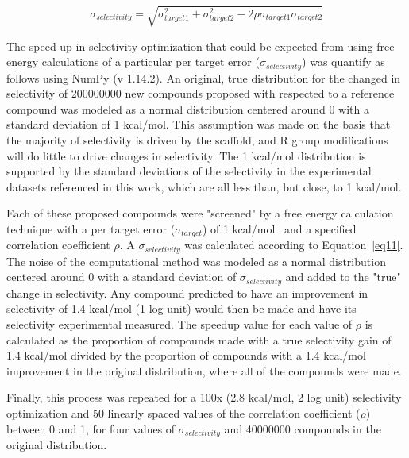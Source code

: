 \documentclass[9pt,lineno]{elife-modified} %
\begin{document}
\begin{equation}\label{eq11}
\sigma_{selectivity} = \sqrt{\sigma_{target1}^2 + \sigma_{target2}^2 - 2\rho\sigma_{target1}\sigma_{target2}}
\end{equation}

The speed up in selectivity optimization that could be expected from using free energy calculations of a particular per target error ($\sigma_{selectivity}$) was quantify as follows using NumPy (v 1.14.2). An original, true distribution for the changed in selectivity of 200000000 new compounds proposed with respected to a reference compound was modeled as a normal distribution centered around 0 with a standard deviation of 1 kcal/mol. This assumption was made on the basis that the majority of selectivity is driven by the scaffold, and R group modifications will do little to drive changes in selectivity. The 1 kcal/mol distribution is supported by the standard deviations of the selectivity in the experimental datasets referenced in this work, which are all less than, but close, to 1 kcal/mol. 

Each of these proposed compounds were "screened" by a free energy calculation technique with a per target error ($\sigma_{target}$) of 1 kcal/mol~\citep{Wang:J.Am.Chem.Soc.:2015} and a specified correlation coefficient $\rho$. A $\sigma_{selectivity}$ was calculated according to Equation~\ref{eq11}. The noise of the computational method was modeled as a normal distribution centered around 0 with a standard deviation of $\sigma_{selectivity}$ and added to the "true" change in selectivity. Any compound predicted to have an improvement in selectivity of 1.4 kcal/mol (1 log unit) would then be made and have its selectivity experimental measured. The speedup value for each value of $\rho$ is calculated as the proportion of compounds made with a true selectivity gain of 1.4 kcal/mol divided by the proportion of compounds with a 1.4 kcal/mol improvement in the original distribution, where all of the compounds were made. 

Finally, this process was repeated for a 100x (2.8 kcal/mol, 2 log unit) selectivity optimization and 50 linearly spaced values of the correlation coefficient ($\rho$) between 0 and 1, for four values of $\sigma_{selectivity}$ and 40000000 compounds in the original distribution. 
\end{document}
